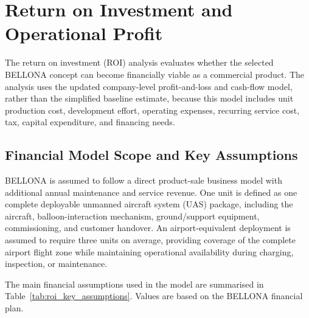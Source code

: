 \chapter{Return on Investment and Operational Profit}
\label{sec:roi}

The return on investment (ROI) analysis evaluates whether the selected BELLONA concept can become financially viable as a commercial product. The analysis uses the updated company-level profit-and-loss and cash-flow model, rather than the simplified baseline estimate, because this model includes unit production cost, development effort, operating expenses, recurring service cost, tax, capital expenditure, and financing needs. 

\section{Financial Model Scope and Key Assumptions}

BELLONA is assumed to follow a direct product-sale business model with additional annual maintenance and service revenue. One unit is defined as one complete deployable unmanned aircraft system (UAS) package, including the aircraft, balloon-interaction mechanism, ground/support equipment, commissioning, and customer handover. An airport-equivalent deployment is assumed to require three units on average, providing coverage of the complete airport flight zone while maintaining operational availability during charging, inspection, or maintenance.

The main financial assumptions used in the model are summarised in Table~\ref{tab:roi_key_assumptions}. Values are based on the BELLONA financial plan.

